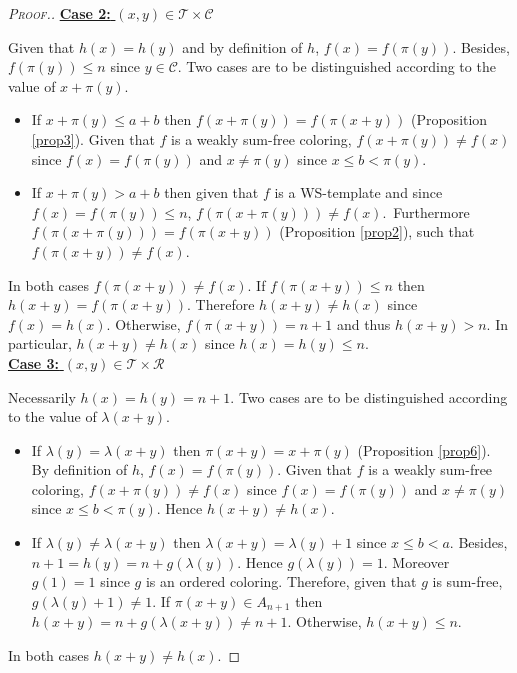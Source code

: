 \begin{proof}[\textsc{Proof.}]
\noindent \underline{\textbf{Case 2:} \((x,y) \in \mathcal{T} \times \mathcal{C}\)}
\par
Given that \(h(x) = h(y)\) and by definition of \(h\), \(f(x) = f(\pi(y))\). Besides, \(f(\pi(y)) \leqslant n\) since
\(y \in \mathcal{C}\). Two cases are to be distinguished according to the value of \(x + \pi(y)\).
\begin{itemize}
\item \begin{sloppypar}
	If \(x + \pi(y) \leqslant a + b\) then \(f(x + \pi(y)) = f(\pi(x + y))\) (Proposition \ref{prop3}). Given that \(f\) is
	a weakly sum-free coloring, \(f(x+\pi(y)) \neq f(x)\) since \(f(x)=f(\pi(y))\) and \(x \neq \pi(y)\) since
	\({x \leqslant b < \pi(y)}\).
	\end{sloppypar}
\item \begin{sloppypar}
	If \(x+\pi(y)> a+b\) then given that \(f\) is a WS-template and since \({f(x) = f(\pi(y)) \leqslant n}\),
	\({f(\pi(x+\pi(y))) \neq f(x)}\).~Furthermore \({f(\pi(x+\pi(y))) = f(\pi(x+y))}\) (Proposition \ref{prop2}), such that
	\({f(\pi(x+ y)) \neq f(x)}\).
	\end{sloppypar}
\end{itemize}
\par
In both cases \(f(\pi(x+y)) \neq f(x)\). If  \(f(\pi(x+y)) \leqslant n\) then \(h(x+y) = f(\pi(x+y))\). Therefore
\(h(x+y) \neq h(x)\) since \(f(x) = h(x)\). Otherwise, \(f(\pi(x+y)) = n + 1\) and thus \(h(x+y) > n\). In particular,
\(h(x + y) \neq h(x)\) since \(h(x) = h(y) \leqslant n\). \\

\noindent \underline{\textbf{Case 3:} \((x,y) \in \mathcal{T} \times \mathcal{R}\)}
\par
Necessarily \(h(x) = h(y) = n + 1\). Two cases are to be distinguished according to the value of \(\lambda(x+y)\).
\begin{itemize}
\item If \(\lambda(y)=\lambda(x+y)\) then \(\pi(x + y) = x + \pi(y)\) (Proposition \ref{prop6}). By definition of
	\(h\), \(f(x) = f(\pi(y))\). Given that \(f\) is a weakly sum-free coloring, \(f(x + \pi(y)) \neq f(x)\) since
	\(f(x) = f(\pi(y))\) and \(x \neq \pi(y)\) since \({x \leqslant b < \pi(y)}\). Hence \(h(x + y) \neq h(x)\).
\item If \(\lambda(y) \neq \lambda(x + y)\) then \(\lambda(x + y) = \lambda(y) + 1\) since \(x \leqslant b < a\).
	Besides, \(n + 1 = h(y) = n +  g(\lambda(y))\). Hence \(g(\lambda(y)) = 1\). Moreover \(g(1) = 1\) since \(g\)
	is an ordered coloring. Therefore, given that \(g\) is sum-free, \(g(\lambda(y) + 1) \neq 1\). If \(\pi(x + y) \in
	A_{n + 1}\) then \(h(x + y) = n + g(\lambda(x + y)) \neq n + 1\). Otherwise, \(h(x + y) \leqslant n\).
\end{itemize}
\par
In both cases \(h(x + y) \neq h(x)\).


\end{proof}
